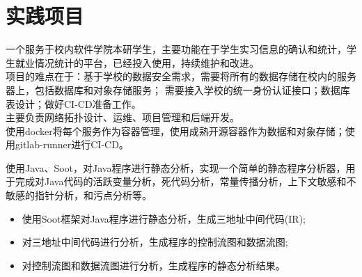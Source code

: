 \documentclass{resume}
\begin{document}
\section{实践项目}
\Contents
{一个服务于校内软件学院本研学生，主要功能在于学生实习信息的确认和统计，学生就业情况统计的平台，已经投入使用，持续维护和改进。}
{\\
项目的难点在于：基于学校的数据安全需求，需要将所有的数据存储在校内的服务器上，包括数据库和对象存储服务；
需要接入学校的统一身份认证接口；数据库表设计；做好CI-CD准备工作。
\\主要负责网络拓扑设计、运维、项目管理和后端开发。\\使用docker将每个服务作为容器管理，使用成熟开源容器作为数据和对象存储；使用gitlab-runner进行CI-CD。 }



\Contents
{使用Java、Soot，对Java程序进行静态分析，实现一个简单的静态程序分析器，用于完成对Java代码的活跃变量分析，死代码分析，常量传播分析，上下文敏感和不敏感的指针分析，和污点分析等。}
{\begin{itemize}
    \item 使用Soot框架对Java程序进行静态分析，生成三地址中间代码(IR);
    \item 对三地址中间代码进行分析，生成程序的控制流图和数据流图;
    \item 对控制流图和数据流图进行分析，生成程序的静态分析结果。
\end{itemize} }
\sepspace
\end{document}

